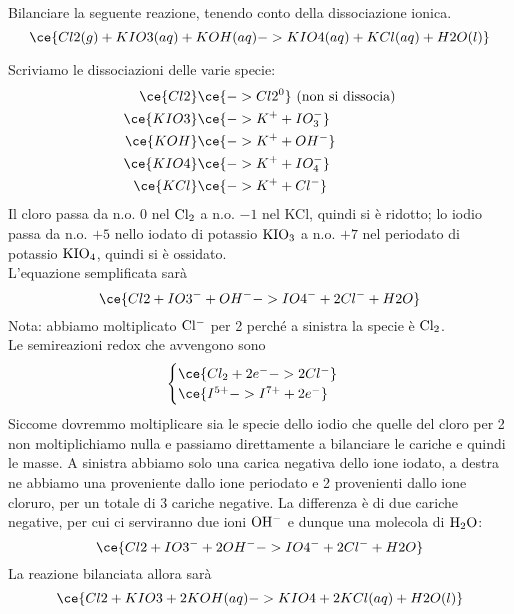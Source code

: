 \begin{esercizio}
    Bilanciare la seguente reazione, tenendo conto della dissociazione ionica.
    \begin{equation*}
        \ce{Cl2(g) + KIO3(aq) + KOH(aq) -> KIO4(aq) + KCl(aq) + H2O(l)}
    \end{equation*}
\end{esercizio}
\begin{soluzione}
    Scriviamo le dissociazioni delle varie specie:
    \begin{equation*}
        \begin{split}
            \ce{Cl2} & \ce{-> Cl2^0} \text{ (non si dissocia)}
            \\
            \ce{KIO3} & \ce{-> K^+ + IO_3^-}
            \\
            \ce{KOH} & \ce{-> K^+ + OH^-}
            \\
            \ce{KIO4} & \ce{-> K^+ + IO_4^-}
            \\
            \ce{KCl} & \ce{-> K^+ + Cl^-}
            \\
        \end{split}
    \end{equation*}
    Il cloro passa da n.o. $0$ nel $\rm Cl_2$ a n.o. $-1$ nel KCl, quindi si è ridotto; lo iodio passa da n.o. $+5$ nello iodato di potassio $\rm KIO_3$ a n.o. $+7$ nel periodato di potassio $\rm KIO_4$, quindi si è ossidato.\\
    L'equazione semplificata sarà
    \begin{equation*}
        \ce{Cl2 + IO3^- + OH^- -> IO4^- + 2Cl^- + H2O}
    \end{equation*}
    Nota: abbiamo moltiplicato $\rm Cl^-$ per 2 perché a sinistra la specie è $\rm Cl_2$.\\
    Le semireazioni redox che avvengono sono
    \begin{equation*}
        \begin{cases}
            \ce{Cl_2 + 2e^- -> 2Cl^-}\\
            \ce{I^{5+} -> I^{7+} + 2e^-}
        \end{cases}
    \end{equation*}
    Siccome dovremmo moltiplicare sia le specie dello iodio che quelle del cloro per 2 non moltiplichiamo nulla e passiamo direttamente a bilanciare le cariche e quindi le masse. A sinistra abbiamo solo una carica negativa dello ione iodato, a destra ne abbiamo una proveniente dallo ione periodato e 2 provenienti dallo ione cloruro, per un totale di 3 cariche negative. La differenza è di due cariche negative, per cui ci serviranno due ioni $\rm OH^-$ e dunque una molecola di $\rm H_2O$:
    \begin{equation*}
        \ce{Cl2 + IO3^- + 2OH^- -> IO4^- + 2Cl^- + H2O}
    \end{equation*}
    La reazione bilanciata allora sarà
    \begin{equation*}
        \ce{Cl2 + KIO3 + 2KOH(aq) -> KIO4 + 2KCl(aq) + H2O(l)}
    \end{equation*}
\end{soluzione}

